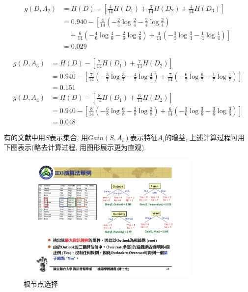 \documentclass[a4paper,UTF8]{ctexart}
\theoremstyle{plain} \newtheorem{theorem}{定理}[section]
\theoremstyle{plain} \newtheorem{definition}{定义}[section]
\theoremstyle{plain} \newtheorem{lemma}{引理}[section]
\theoremstyle{plain} \newtheorem{proposition}{命题}[section]
\theoremstyle{plain} \newtheorem{example}{例}
\theoremstyle{plain} \newtheorem{remark}{注}
\theoremstyle{plain} \newtheorem{corollary}{推论}[section]
\begin{document}
\begin{align*}
g(D, A_{2}) & = H(D) - \left[ \frac{4}{14} H(D_{1}) + \frac{6}{14} H(D_{2}) + \frac{4}{14} H(D_{3}) \right] \\ 
& = 0.940 - \left[ \frac{4}{14} \left( - \frac{2}{4} \log \frac{2}{4} - \frac{2}{4} \log \frac{2}{4} \right) \right. \\ 
& \quad + \left. \frac{6}{14} \left( - \frac{4}{6} \log \frac{4}{6} - \frac{2}{6} \log \frac{2}{6} \right) + \frac{4}{14} \left( - \frac{3}{4} \log \frac{3}{4} - \frac{1}{4} \log \frac{1}{4} \right) \right] \\ 
& = 0.029 
\end{align*}

\begin{align*}
g(D, A_{3}) & = H(D) - \left[ \frac{7}{14} H(D_{1}) + \frac{7}{14} H(D_{2}) \right] \\ 
& = 0.940 - \left[ \frac{7}{14} \left( - \frac{3}{7} \log \frac{3}{7} - \frac{4}{7} \log \frac{4}{7} \right) + \frac{7}{14} \left( - \frac{6}{7} \log \frac{6}{7} - \frac{1}{7} \log \frac{1}{7} \right) \right] \\ 
& = 0.151 \\ 
g(D, A_{4}) & = H(D) - \left[ \frac{8}{14} H(D_{1}) + \frac{6}{14} H(D_{2}) \right] \\ 
& = 0.940 - \left[ \frac{8}{14} \left( - \frac{6}{8} \log \frac{6}{8} - \frac{2}{8} \log \frac{2}{8} \right) + \frac{6}{14} \left( - \frac{3}{6} \log \frac{3}{6} - \frac{3}{6} \log \frac{3}{6} \right) \right] \\ 
& = 0.048
\end{align*}

有的文献中用$S$表示集合, 用$Gain(S, A_{i})$表示特征$A_{i}$的增益, 上述计算过程可用下图表示(略去计算过程, 用图形展示更为直观).

\begin{figure}[!htb]
	\centering
	\includegraphics[width=0.80\textwidth]{tennis.pdf}
	\caption{根节点选择}
	\label{tennisnode}
\end{figure}
\end{document}
